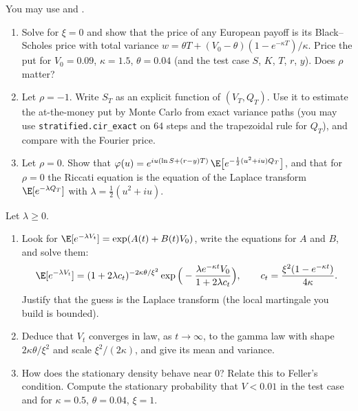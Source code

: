 \begin{exercise}\label{ex:sv-degenerate}
\easy You may use  and .
\begin{enumerate}[label=(\alph*)]
  \item Solve  for $\xi=0$ and show that the price of any European payoff is its
    Black--Scholes price with total variance $w=\theta T+(V_0-\theta)(1-e^{-\kappa T})/\kappa$. Price the put for
    $V_0=0.09$, $\kappa=1.5$, $\theta=0.04$ (and the test case $S$, $K$, $T$, $r$, $y$). Does $\rho$ matter?
  \item Let $\rho=-1$. Write $S_T$ as an explicit function of $(V_T,Q_T)$. Use it to estimate the at-the-money
    put by Monte Carlo from exact variance paths (you may use \texttt{stratified.cir\_exact} on $64$ steps and the
    trapezoidal rule for $Q_T$), and compare with the Fourier price.
  \item Let $\rho=0$. Show that $\varphi(u)=e^{iu(\ln S+(r-y)T)}\,\E\big[e^{-\frac12(u^2+iu)Q_T}\big]$, and that for
    $\rho=0$ the Riccati equation  is the equation of the Laplace transform
    $\E[e^{-\lambda Q_T}]$ with $\lambda=\frac12(u^2+iu)$.
\end{enumerate}
\end{exercise}

\begin{exercise}\label{ex:sv-variance-law}
\medium Let $\lambda\ge0$.
\begin{enumerate}[label=(\alph*)]
  \item Look for $\E[e^{-\lambda V_t}]=\exp(A(t)+B(t)V_0)$, write the equations for $A$ and $B$, and solve them:
    \[
      \E[e^{-\lambda V_t}]=(1+2\lambda c_t)^{-2\kappa\theta/\xi^2}\exp\Big(-\frac{\lambda e^{-\kappa t}V_0}{1+2\lambda c_t}\Big),\qquad
      c_t=\frac{\xi^2(1-e^{-\kappa t})}{4\kappa}.
    \]
    Justify that the guess is the Laplace transform (the local martingale you build is bounded).
  \item Deduce that $V_t$ converges in law, as $t\to\infty$, to the gamma law with shape $2\kappa\theta/\xi^2$ and
    scale $\xi^2/(2\kappa)$, and give its mean and variance.
  \item How does the stationary density behave near $0$? Relate this to Feller's condition. Compute the stationary
    probability that $V<0.01$ in the test case and for $\kappa=0.5$, $\theta=0.04$, $\xi=1$.
\end{enumerate}
\end{exercise}

